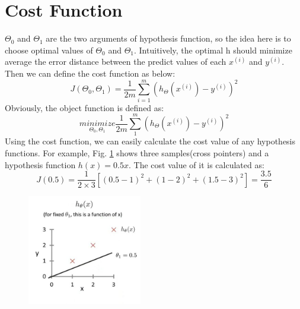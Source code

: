 \documentclass{article}
\begin{document}
\section{Cost Function}
$\Theta_0$ and $\Theta_1$ are the two arguments of hypothesis function, so the idea here is to choose optimal values of $\Theta_0$ and $\Theta_1$. Intuitively, the optimal h should minimize average the error distance between the predict values of each $x^(i)$ and $y^(i)$. Then we can define the cost function as below:
\begin{equation}\label{cost_function}
J(\Theta_0, \Theta_1) = \frac{1}{2m} \sum_{i=1}^{m} (h_\Theta({x^{(i)}})-y^{(i)})^2
\end{equation}
Obviously, the object function is defined as:
\begin{equation}\label{object_function}
\underset{\Theta_0, \Theta_1}{minimize} \frac{1}{2m} \sum_{1}^{m} (h_\Theta({x^{(i)}})-y^{(i)})^2
\end{equation}
Using the cost function, we can easily calculate the cost value of any hypothesis functions. For example, Fig. \ref{examples_hypothesis_plot} shows three samples(cross pointers) and a hypothesis function $h(x)=0.5x$. The cost value of it is calculated as:
\begin{equation}\label{cost_function_example}
J(0.5)=\frac{1}{2 \times 3}[(0.5-1)^2 + (1-2)^2 + (1.5-3)^2]=\frac {3.5}{6}
\end{equation}
\begin{figure}[ht]
  \centering
  \includegraphics[width=5cm]{Figure1.jpg}\\
  \caption{}\label{examples_hypothesis_plot}
\end{figure}
\end{document}
